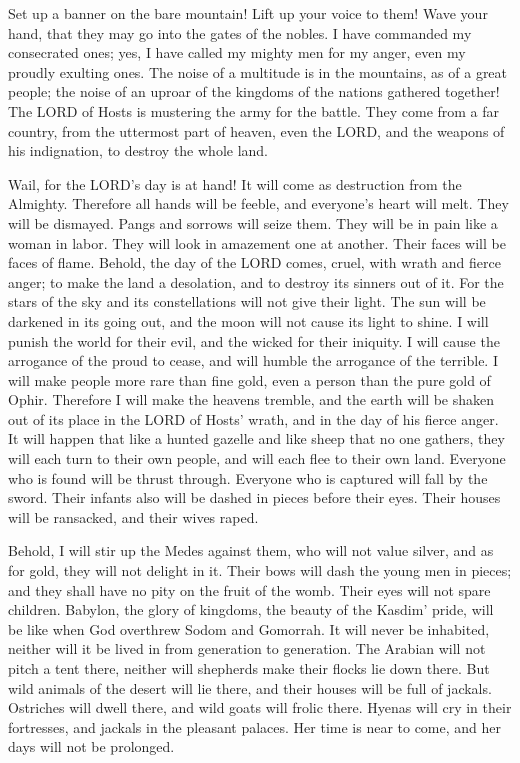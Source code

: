 \quad\quad \myverse{}Set up a banner on the bare mountain! Lift up your voice to them!
Wave your hand, that they may go into the gates of the nobles.
\myverse{}I have commanded my consecrated ones; yes, I have called my mighty men for
my anger, even my proudly exulting ones.
\myverse{}The noise of a multitude is in the mountains, as of a great people; the noise
of an uproar of the kingdoms of the nations gathered together! The LORD of Hosts is mustering the army
for the battle.
\myverse{}They come from a far country, from the uttermost part of heaven, even the LORD,
and the weapons of his indignation, to destroy the whole land.

\myverse{}Wail, for the LORD’s day is at hand! It will come as destruction
from the Almighty.
\myverse{}Therefore all hands will be feeble, and everyone’s heart will melt.
\myverse{}They will be dismayed. Pangs and sorrows will seize them. They will be in pain
like a woman in labor. They will look in amazement one at another. Their faces will be faces of flame.
\myverse{}Behold, the day of the LORD comes, cruel, with wrath and fierce anger; to make
the land a desolation, and to destroy its sinners out of it.
\myverse{}For the stars of the sky and its constellations will not give their light.
The sun will be darkened in its going out, and the moon will not cause its light to shine.
\myverse{}I will punish the world for their evil, and the wicked for their iniquity.
I will cause the arrogance of the proud to cease, and will humble the arrogance of the terrible.
\myverse{}I will make people more rare than fine gold, even a person than the pure
gold of Ophir.
\myverse{}Therefore I will make the heavens tremble, and the earth will be shaken out
of its place in the LORD of Hosts’ wrath, and in the day of his fierce anger.
\myverse{}It will happen that like a hunted gazelle and like sheep that no one gathers,
they will each turn to their own people, and will each flee to their own land.
\myverse{}Everyone who is found will be thrust through. Everyone who is captured will
fall by the sword.
\myverse{}Their infants also will be dashed in pieces before their eyes. Their houses
will be ransacked, and their wives raped.

\myverse{}Behold, I will stir up the Medes against them, who will not
value silver, and as for gold, they will not delight in it.
\myverse{}Their bows will dash the young men in pieces; and they shall have no pity
on the fruit of the womb. Their eyes will not spare children.
\myverse{}Babylon, the glory of kingdoms, the beauty of the Kasdim’ pride, will be
like when God overthrew Sodom and Gomorrah.
\myverse{}It will never be inhabited, neither will it be lived in from generation to
generation. The Arabian will not pitch a tent there, neither will shepherds make their flocks lie down
there.
\myverse{}But wild animals of the desert will lie there, and their houses will be full
of jackals. Ostriches will dwell there, and wild goats will frolic there.
\myverse{}Hyenas will cry in their fortresses, and jackals in the pleasant palaces.
Her time is near to come, and her days will not be prolonged.


